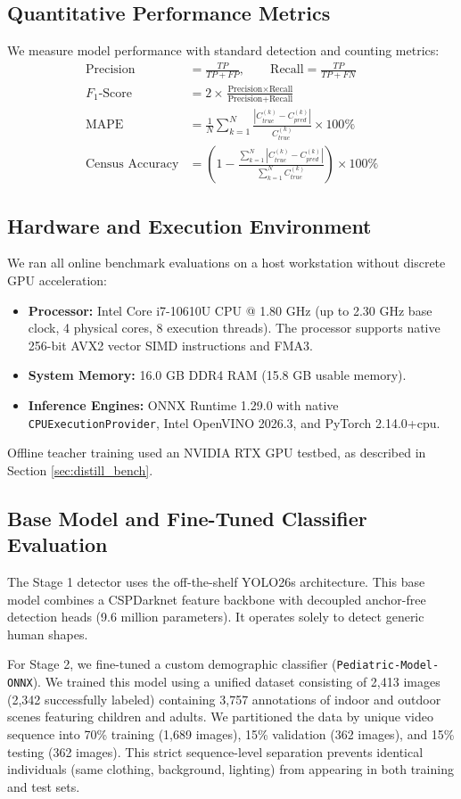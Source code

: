 \subsection{Quantitative Performance Metrics}
We measure model performance with standard detection and counting metrics:
\begin{align}
    \text{Precision} &= \frac{TP}{TP + FP}, \qquad \text{Recall} = \frac{TP}{TP + FN} \\
    F_1\text{-Score} &= 2 \times \frac{\text{Precision} \times \text{Recall}}{\text{Precision} + \text{Recall}} \\
    \text{MAPE} &= \frac{1}{N}\sum_{k=1}^N \frac{|C_{true}^{(k)} - C_{pred}^{(k)}|}{C_{true}^{(k)}} \times 100\% \\
    \text{Census Accuracy} &= \left( 1 - \frac{\sum_{k=1}^{N}|C^{(k)}_{true} - C^{(k)}_{pred}|}{\sum_{k=1}^{N}C^{(k)}_{true}} \right) \times 100\%
\end{align}
\subsection{Hardware and Execution Environment}
We ran all online benchmark evaluations on a host workstation without discrete GPU acceleration:
\begin{itemize}
    \item \textbf{Processor:} Intel Core i7-10610U CPU @ 1.80 GHz (up to 2.30 GHz base clock, 4 physical cores, 8 execution threads). The processor supports native 256-bit AVX2 vector SIMD instructions and FMA3.
    \item \textbf{System Memory:} 16.0 GB DDR4 RAM (15.8 GB usable memory).
    \item \textbf{Inference Engines:} ONNX Runtime 1.29.0 with native \texttt{CPUExecutionProvider}, Intel OpenVINO 2026.3, and PyTorch 2.14.0+cpu.
\end{itemize}
Offline teacher training used an NVIDIA RTX GPU testbed, as described in Section \ref{sec:distill_bench}.

\subsection{Base Model and Fine-Tuned Classifier Evaluation}
The Stage 1 detector uses the off-the-shelf YOLO26s architecture. This base model combines a CSPDarknet feature backbone with decoupled anchor-free detection heads (9.6 million parameters). It operates solely to detect generic human shapes.

For Stage 2, we fine-tuned a custom demographic classifier (\texttt{Pediatric-Model-ONNX}). We trained this model using a unified dataset consisting of 2,413 images (2,342 successfully labeled) containing 3,757 annotations of indoor and outdoor scenes featuring children and adults. We partitioned the data by unique video sequence into 70\% training (1,689 images), 15\% validation (362 images), and 15\% testing (362 images). This strict sequence-level separation prevents identical individuals (same clothing, background, lighting) from appearing in both training and test sets.

